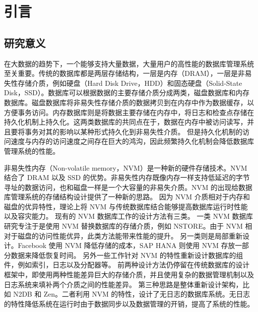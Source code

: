 
\chapter{引言}

\section{研究意义}

在大数据的趋势下，一个能够支持大量数据，大量用户的高性能的数据库管理系统至关重要。传统的数据库都是两层存储结构，一层是内存（DRAM），一层是非易失性存储介质，例如硬盘（Hard Disk Drive，HDD）和固态硬盘（Solid-State Disk，SSD）。数据库可以根据数据的主要存储介质分成两类，磁盘数据库和内存数据库。磁盘数据库将非易失性存储介质的数据拷贝到在内存中作为数据缓存，以方便事务访问。内存数据库则是将数据主要存储在内存中，将日志和检查点存储在持久化机制上持久化。这两类数据库的共同点在于，数据在内存中被访问读写，并且要将事务对其的影响以某种形式持久化到非易失性介质。
但是持久化机制的访问速度与内存的访问速度之间存在巨大的鸿沟，因此频繁持久化机制会降低数据库管理系统的性能。

非易失性内存（Non-volatile memory，NVM）是一种新的硬件存储技术。NVM 结合了 DRAM 以及 SSD 的优势。非易失性内存既像内存一样支持低延迟的字节寻址的数据访问，也和磁盘一样是一个大容量的非易失介质。NVM 的出现给数据库管理系统的存储结构设计提供了一种新的思路。
因为 NVM 介质相对于内存和磁盘的优异特性，理论上将 NVM 与传统数据库结合能够提高数据库运行时性能以及容灾能力。
现有的 NVM 数据库工作的设计方法有三类。
一类 NVM 数据库研究专注于是使用 NVM 替换数据库的存储介质，例如 NSTORE\cite{arulraj_lets_2015}。由于 NVM 相对于磁盘的访问性能优异，此类方法能带来性能的提升。
另一类则是局部重新设计。Facebook 使用 NVM 降低存储的成本\cite{facebook}，SAP HANA 则使用 NVM 存放一部分数据来降低恢复时间\cite{andrei_sap_2017}。
另外一些工作针对 NVM 的特性重新设计数据库的组件，例如索引\cite{nv-tree,chen_persistent_2015,ma_roart_2021}，日志\cite{wbl}以及分配器\cite{pmdk,bhandari_makalu_2016}等。
前两种设计方法仍停留在传统数据库的设计框架中，即使用两种性能差异巨大的存储介质，并且使用复杂的数据管理机制以及日志系统来填补两个介质之间的性能差异。
第三种思路是整体重新设计架构，比如 N2DB\cite{liu_graduate} 和 Zen\cite{liu_zen_2021}。二者利用 NVM 的特性，设计了无日志的数据库系统。无日志的特性降低系统在运行时由于数据同步以及数据管理的开销，提高了系统的性能。


